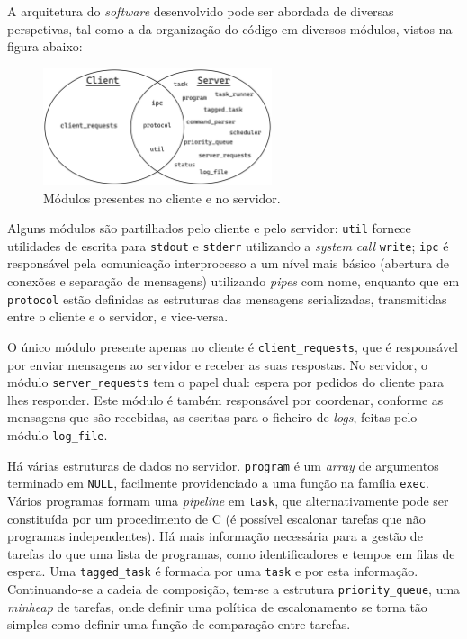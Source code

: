 \documentclass[11pt]{article}
\begin{document}
A arquitetura do \emph{software} desenvolvido pode ser abordada de diversas perspetivas, tal como a
da organização do código em diversos módulos, vistos na figura abaixo: \\

\begin{figure}[H]
    \centering
    \includegraphics[width=0.6\textwidth]{report_figures/modules_venn_diagram.png}
    \caption{Módulos presentes no cliente e no servidor.}
\end{figure}

Alguns módulos são partilhados pelo cliente e pelo servidor: \texttt{util} fornece utilidades de
escrita para \texttt{stdout} e \texttt{stderr} utilizando a \emph{system call} \texttt{write};
\texttt{ipc} é responsável pela comunicação interprocesso a um nível mais básico (abertura de
conexões e separação de mensagens) utilizando \emph{pipes} com nome, enquanto que em
\texttt{protocol} estão definidas as estruturas das mensagens serializadas, transmitidas entre o
cliente e o servidor, e vice-versa.

O único módulo presente apenas no cliente é \texttt{client\_requests}, que é responsável por enviar
mensagens ao servidor e receber as suas respostas. No servidor, o módulo \texttt{server\_requests}
tem o papel dual: espera por pedidos do cliente para lhes responder. Este módulo é também
responsável por coordenar, conforme as mensagens que são recebidas, as escritas para o ficheiro de
\emph{logs}, feitas pelo módulo \texttt{log\_file}.

Há várias estruturas de dados no servidor. \texttt{program} é um \emph{array} de argumentos
terminado em \texttt{NULL}, facilmente providenciado a uma função na família \texttt{exec}. Vários
programas formam uma \emph{pipeline} em \texttt{task}, que alternativamente pode ser constituída por
um procedimento de C (é possível escalonar tarefas que não programas independentes). Há mais
informação necessária para a gestão de tarefas do que uma lista de programas, como identificadores e
tempos em filas de espera. Uma \texttt{tagged\_task} é formada por uma \texttt{task} e por esta
informação. Continuando-se a cadeia de composição, tem-se a estrutura \texttt{priority\_queue}, uma
\emph{minheap} de tarefas, onde definir uma política de escalonamento se torna tão simples como
definir uma função de comparação entre tarefas.
\end{document}
